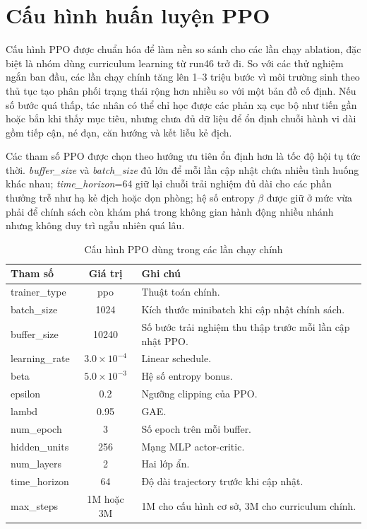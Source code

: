 \section{Cấu hình huấn luyện PPO}

Cấu hình PPO được chuẩn hóa để làm nền so sánh cho các lần chạy ablation, đặc biệt là nhóm dùng curriculum learning từ run46 trở đi. So với các thử nghiệm ngắn ban đầu, các lần chạy chính tăng lên 1--3 triệu bước vì môi trường sinh theo thủ tục tạo phân phối trạng thái rộng hơn nhiều so với một bản đồ cố định. Nếu số bước quá thấp, tác nhân có thể chỉ học được các phản xạ cục bộ như tiến gần hoặc bắn khi thấy mục tiêu, nhưng chưa đủ dữ liệu để ổn định chuỗi hành vi dài gồm tiếp cận, né đạn, căn hướng và kết liễu kẻ địch.

Các tham số PPO được chọn theo hướng ưu tiên ổn định hơn là tốc độ hội tụ tức thời. \emph{buffer\_size} và \emph{batch\_size} đủ lớn để mỗi lần cập nhật chứa nhiều tình huống khác nhau; \emph{time\_horizon}=64 giữ lại chuỗi trải nghiệm đủ dài cho các phần thưởng trễ như hạ kẻ địch hoặc dọn phòng; hệ số entropy $\beta$ được giữ ở mức vừa phải để chính sách còn khám phá trong không gian hành động nhiều nhánh nhưng không duy trì ngẫu nhiên quá lâu.

\begin{table}[H]
    \centering
    \small
    \caption{Cấu hình PPO dùng trong các lần chạy chính}
    \label{tab:ppo_baseline_config}
    \begin{tabular}{|p{4cm}|c|p{7cm}|}
        \hline
        \textbf{Tham số} & \textbf{Giá trị} & \textbf{Ghi chú} \\
        \hline
        trainer\_type & ppo & Thuật toán chính. \\
        \hline
        batch\_size & 1024 & Kích thước minibatch khi cập nhật chính sách. \\
        \hline
        buffer\_size & 10240 & Số bước trải nghiệm thu thập trước mỗi lần cập nhật PPO. \\
        \hline
        learning\_rate & $3.0 \times 10^{-4}$ & Linear schedule. \\
        \hline
        beta & $5.0 \times 10^{-3}$ & Hệ số entropy bonus. \\
        \hline
        epsilon & 0.2 & Ngưỡng clipping của PPO. \\
        \hline
        lambd & 0.95 & GAE. \\
        \hline
        num\_epoch & 3 & Số epoch trên mỗi buffer. \\
        \hline
        hidden\_units & 256 & Mạng MLP actor-critic. \\
        \hline
        num\_layers & 2 & Hai lớp ẩn. \\
        \hline
        time\_horizon & 64 & Độ dài trajectory trước khi cập nhật. \\
        \hline
        max\_steps & 1M hoặc 3M & 1M cho cấu hình cơ sở, 3M cho curriculum chính. \\
        \hline
    \end{tabular}
\end{table}

